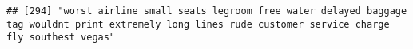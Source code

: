 \documentclass[
]{article}
\begin{document}
\begin{verbatim}
## [294] "worst airline small seats legroom free water delayed baggage tag wouldnt print extremely long lines rude customer service charge fly southest vegas"                                                                                                                                                                                                                                                                                                                                                                                                                                                                                                                                                                                                                                                                                                                                                                                                                                                                                                                                                                                                                                                                                                                                                                                                                                                                                                                                                                                                                                                                                                                                                                                                                                           

\end{verbatim}
\end{document}
